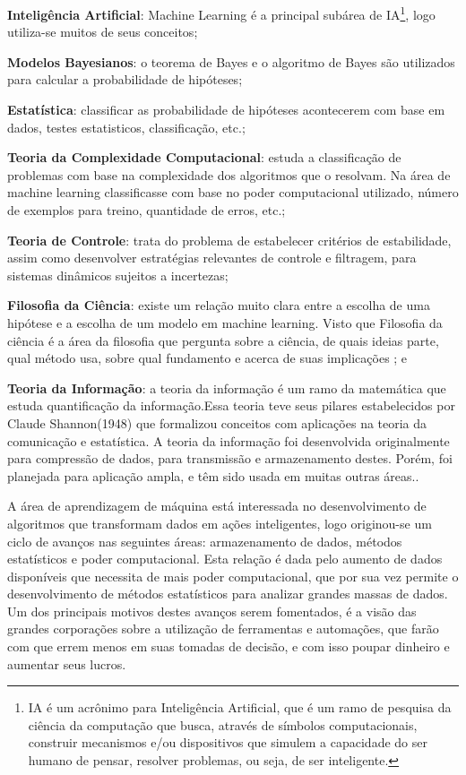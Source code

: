  \begin{alineascomponto}
	\item \textbf{Inteligência Artificial}: Machine Learning é a principal subárea de IA\footnote{IA é um acrônimo para Inteligência Artificial,
	 que é um ramo de pesquisa da ciência da computação que busca, através de símbolos computacionais, construir mecanismos 
	 e/ou dispositivos que simulem a capacidade do ser humano de pensar, resolver problemas, ou seja, de ser inteligente.\cite{IA_Web}},
	 logo utiliza-se muitos de seus conceitos;  
	\item \textbf{Modelos Bayesianos}: o teorema de Bayes e o algoritmo de Bayes são utilizados para calcular a probabilidade de hipóteses;
	\item \textbf{Estatística}: classificar as probabilidade de hipóteses acontecerem com base em dados, testes estatisticos, classificação, etc.;
	\item \textbf{Teoria da Complexidade Computacional}: estuda a classificação de problemas com base na complexidade dos algoritmos que
	o resolvam. Na área de machine learning classificasse com base no poder computacional utilizado, número de exemplos para treino, quantidade de erros, etc.;   
	\item \textbf{Teoria de Controle}: trata do problema de estabelecer critérios de estabilidade, assim como desenvolver estratégias 
	relevantes de controle e filtragem, para sistemas dinâmicos sujeitos a incertezas;
	\item \textbf{Filosofia da Ciência}: existe um relação muito clara entre a escolha de uma hipótese e a escolha de um modelo em machine learning. Visto que Filosofia da ciência é a área da filosofia que pergunta sobre a ciência, de quais ideias parte, qual método usa, sobre qual fundamento e acerca de suas implicações \cite{FilosofiaCiencia}; e
	\item \textbf{Teoria da Informação}: a teoria da informação é um ramo da matemática que estuda quantificação da informação.Essa teoria teve seus 
	pilares estabelecidos por Claude Shannon(1948) que formalizou conceitos com aplicações na teoria da comunicação e estatística. 
	A teoria da informação foi desenvolvida originalmente para compressão de dados, para transmissão e armazenamento destes. 
	Porém, foi planejada para aplicação ampla, e têm sido usada em muitas outras áreas.\cite{TeoriaInformacao}.	
\end{alineascomponto}

A área de aprendizagem de máquina está interessada no desenvolvimento de algoritmos que transformam dados em ações inteligentes, logo originou-se
um ciclo de avanços nas seguintes áreas: armazenamento de dados, métodos estatísticos e poder computacional. 
Esta relação é dada pelo aumento de dados disponíveis que necessita de 
mais poder computacional, que por sua vez permite o desenvolvimento de métodos estatísticos para analizar grandes massas de dados. Um dos principais motivos destes avanços serem fomentados, 
é a visão das grandes corporações sobre a utilização de ferramentas e automações, que farão com que errem menos em suas tomadas de decisão, e com isso poupar dinheiro e aumentar seus lucros.

